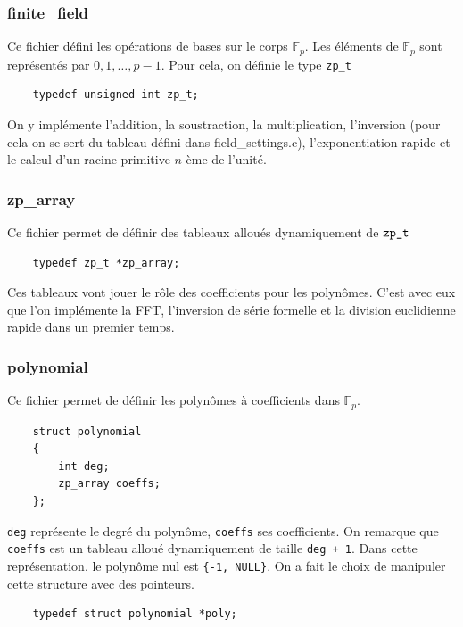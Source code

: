 \documentclass{article}
\theoremstyle{definition}
\theoremstyle{remark}
\begin{document}
\subsubsection{finite\_field}

Ce fichier défini les opérations de bases sur le corps $\mathbb{F}_p$. Les éléments de $\mathbb{F}_p$ sont représentés par $0, 1, \dots, p-1$. Pour cela, on définie le type \verb|zp_t| 

\begin{verbatim}
    typedef unsigned int zp_t;
\end{verbatim}

On y implémente l'addition, la soustraction, la multiplication, l'inversion (pour cela on se sert du tableau défini dans field\_settings.c), l'exponentiation rapide et le calcul d'un racine primitive $n$-ème de l'unité.

\subsubsection{zp\_array}

Ce fichier permet de définir des tableaux alloués dynamiquement de $\verb|zp_t|$

\begin{verbatim}
    typedef zp_t *zp_array;
\end{verbatim}

Ces tableaux vont jouer le rôle des coefficients pour les polynômes. C'est avec eux que l'on implémente la FFT, l'inversion de série formelle et la division euclidienne rapide dans un premier temps.

\subsubsection{polynomial}

Ce fichier permet de définir les polynômes à coefficients dans $\mathbb{F}_p$.

\begin{verbatim}
    struct polynomial
    {
        int deg;
        zp_array coeffs;
    };
\end{verbatim}

\verb|deg| représente le degré du polynôme, \verb|coeffs| ses coefficients. On remarque que \verb|coeffs| est un tableau alloué dynamiquement de taille \verb|deg + 1|. Dans cette représentation, le polynôme nul est \verb|{-1, NULL}|. On a fait le choix de manipuler cette structure avec des pointeurs.

\begin{verbatim}
    typedef struct polynomial *poly;
\end{verbatim}
\end{document}
